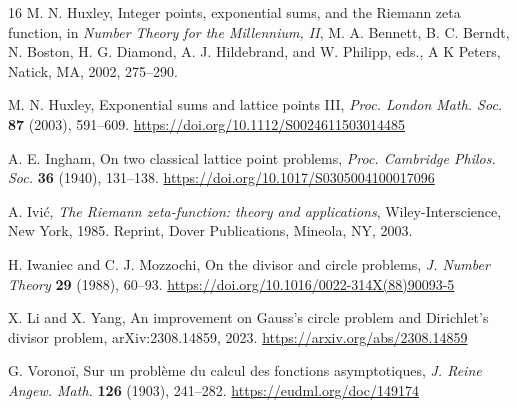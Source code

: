 \documentclass[11pt]{article}
\begin{document}
\begin{thebibliography}{16}
M. N. Huxley,
Integer points, exponential sums, and the Riemann zeta function,
in \emph{Number Theory for the Millennium, II},
M. A. Bennett, B. C. Berndt, N. Boston, H. G. Diamond,
A. J. Hildebrand, and W. Philipp, eds., A K Peters, Natick, MA, 2002,
275--290.

M. N. Huxley,
Exponential sums and lattice points III,
\emph{Proc. London Math. Soc.} \textbf{87} (2003), 591--609.
\url{https://doi.org/10.1112/S0024611503014485}

A. E. Ingham,
On two classical lattice point problems,
\emph{Proc. Cambridge Philos. Soc.} \textbf{36} (1940), 131--138.
\url{https://doi.org/10.1017/S0305004100017096}

A. Ivi\'c,
\emph{The Riemann zeta-function: theory and applications},
Wiley-Interscience, New York, 1985. Reprint, Dover Publications, Mineola,
NY, 2003.

H. Iwaniec and C. J. Mozzochi,
On the divisor and circle problems,
\emph{J. Number Theory} \textbf{29} (1988), 60--93.
\url{https://doi.org/10.1016/0022-314X(88)90093-5}

X. Li and X. Yang,
An improvement on Gauss's circle problem and Dirichlet's divisor problem,
arXiv:2308.14859, 2023.
\url{https://arxiv.org/abs/2308.14859}

G. Vorono\"i,
Sur un probl\`eme du calcul des fonctions asymptotiques,
\emph{J. Reine Angew. Math.} \textbf{126} (1903), 241--282.
\url{https://eudml.org/doc/149174}

\end{thebibliography}
\end{document}
